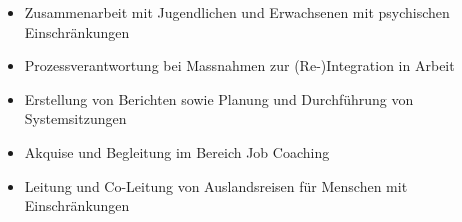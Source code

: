 \documentclass[10pt,a4paper]{altacv}
\begin{document}

\begin{fullwidth}
  \makecvheader
\end{fullwidth}

\vspace{1cm}




     \begin{itemize}
       \item {Zusammenarbeit mit Jugendlichen und Erwachsenen mit psychischen Einschränkungen}
       \item {Prozessverantwortung bei Massnahmen zur (Re-)Integration in Arbeit}
       \item {Erstellung von Berichten sowie Planung und Durchführung von Systemsitzungen}
       \item {Akquise und Begleitung im Bereich Job Coaching}
     \end{itemize}
  \divider


     \begin{itemize}
       \item {Leitung und Co-Leitung von Auslandsreisen für Menschen mit Einschränkungen}
     \end{itemize}
  \divider
\end{document}
